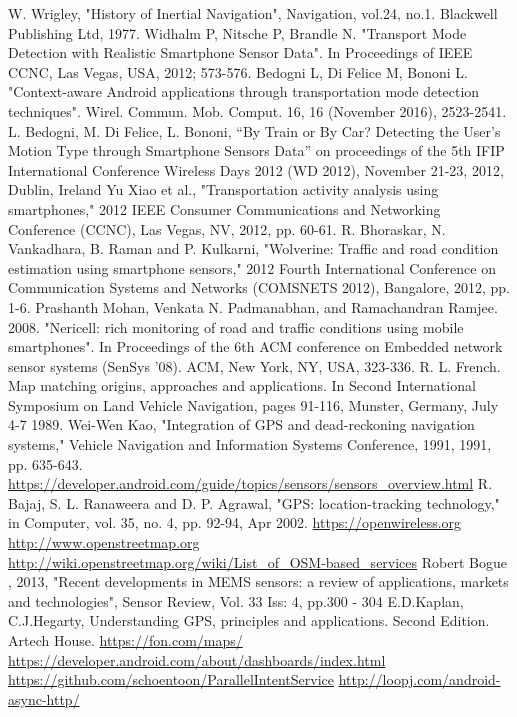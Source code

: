 \documentclass[12pt,a4paper,openright,twoside]{report}
\begin{document}
\begin{thebibliography}{90}             %
\rhead[\fancyplain{}{\bfseries \leftmark}]{\fancyplain{}{\bfseries
\thepage}}
 W. Wrigley, "History of Inertial Navigation", Navigation, vol.24, no.1. Blackwell Publishing Ltd, 1977.
 Widhalm P, Nitsche P, Brandle N. "Transport Mode Detection with Realistic Smartphone Sensor Data". In Proceedings of IEEE CCNC, Las Vegas, USA, 2012; 573-576.
 Bedogni L, Di Felice M, Bononi L. "Context-aware Android applications through transportation mode detection techniques". Wirel. Commun. Mob. Comput. 16, 16 (November 2016), 2523-2541.
 L. Bedogni, M. Di Felice, L. Bononi, “By Train or By Car? Detecting the User’s Motion Type through Smartphone Sensors Data” on proceedings of the 5th IFIP International Conference Wireless Days 2012 (WD 2012), November 21-23, 2012, Dublin, Ireland
 Yu Xiao et al., "Transportation activity analysis using smartphones," 2012 IEEE Consumer Communications and Networking Conference (CCNC), Las Vegas, NV, 2012, pp. 60-61.
 R. Bhoraskar, N. Vankadhara, B. Raman and P. Kulkarni, "Wolverine: Traffic and road condition estimation using smartphone sensors," 2012 Fourth International Conference on Communication Systems and Networks (COMSNETS 2012), Bangalore, 2012, pp. 1-6.
 Prashanth Mohan, Venkata N. Padmanabhan, and Ramachandran Ramjee. 2008. "Nericell: rich monitoring of road and traffic conditions using mobile smartphones". In Proceedings of the 6th ACM conference on Embedded network sensor systems (SenSys '08). ACM, New York, NY, USA, 323-336.
 R. L. French. Map matching origins, approaches and applications. In Second International Symposium on Land Vehicle Navigation, pages 91-116,
Munster, Germany, July 4-7 1989.
 Wei-Wen Kao, "Integration of GPS and dead-reckoning navigation systems," Vehicle Navigation and Information Systems Conference, 1991, 1991, pp. 635-643.
 \url{https://developer.android.com/guide/topics/sensors/sensors_overview.html}
 R. Bajaj, S. L. Ranaweera and D. P. Agrawal, "GPS: location-tracking technology," in Computer, vol. 35, no. 4, pp. 92-94, Apr 2002.
 \url{https://openwireless.org}
 \url{http://www.openstreetmap.org}
 \url{http://wiki.openstreetmap.org/wiki/List_of_OSM-based_services}
 Robert Bogue , 2013, "Recent developments in MEMS sensors: a review of applications, markets and technologies", Sensor Review, Vol. 33 Iss: 4, pp.300 - 304
 E.D.Kaplan, C.J.Hegarty, Understanding GPS, principles and applications. Second Edition. Artech House.
 \url{https://fon.com/maps/}
 \url{https://developer.android.com/about/dashboards/index.html}
 \url{https://github.com/schoentoon/ParallelIntentService}
 \url{http://loopj.com/android-async-http/}


\end{thebibliography}
\end{document}
